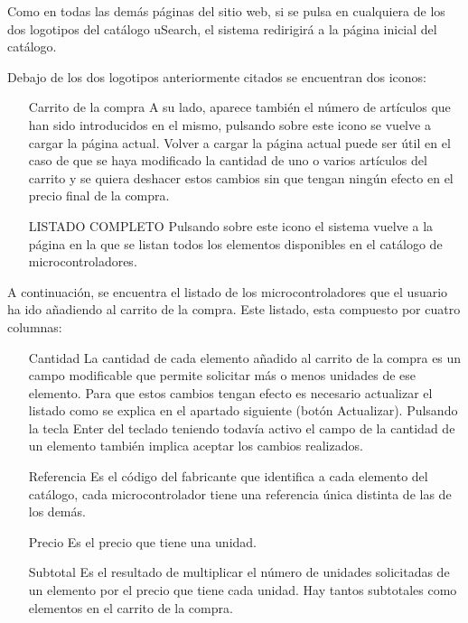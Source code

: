 Como en todas las demás páginas del sitio web, si se pulsa en cualquiera de los dos logotipos del catálogo uSearch,
el sistema redirigirá a la página inicial del catálogo.

Debajo de los dos logotipos anteriormente citados se encuentran dos iconos:

\begin{itemize}
	\item[Carrito de la compra] A su lado, aparece también el número de artículos 
	que han sido introducidos en el mismo, pulsando sobre este icono se vuelve a cargar la página actual. Volver a 				
  cargar la página actual puede ser útil en el caso de que se haya modificado la cantidad de uno o varios artículos 			
  del	carrito y se quiera deshacer estos cambios sin que tengan ningún efecto en el precio final de la compra.

	\item[LISTADO COMPLETO] Pulsando sobre este icono el sistema vuelve a la página en la que se listan todos los
	elementos disponibles en el catálogo de microcontroladores.
\end{itemize}

A continuación, se encuentra el listado de los microcontroladores que el usuario ha ido añadiendo al carrito de la 
compra. Este listado, esta compuesto por cuatro columnas: 
\begin{itemize}
	\item[Cantidad] La cantidad de cada elemento añadido al carrito de la compra es un campo modificable que permite
	solicitar más o menos unidades de ese elemento. Para que estos cambios tengan efecto es necesario actualizar el 
	listado como se explica en el apartado siguiente (botón Actualizar). Pulsando la tecla Enter del teclado teniendo
  todavía activo el campo de la cantidad de un elemento también implica aceptar los cambios realizados.
	
	\item[Referencia] Es el código del fabricante que identifica a cada elemento del catálogo, cada microcontrolador
	tiene una referencia única distinta de las de los demás.
	
	\item[Precio] Es el precio que tiene una unidad.

	\item[Subtotal] Es el resultado de multiplicar el número de unidades solicitadas de un elemento por el precio que
	tiene cada unidad. Hay tantos subtotales como elementos en el carrito de la compra.
\end{itemize}

